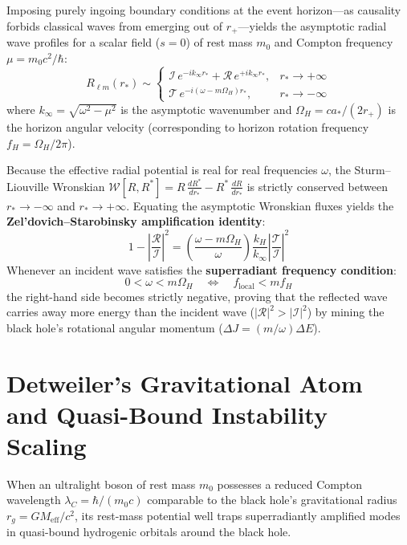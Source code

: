 \documentclass[11pt,a4paper]{article}
\begin{document}
Imposing purely ingoing boundary conditions at the event horizon---as causality forbids classical waves from emerging out of $r_+$---yields the asymptotic radial wave profiles for a scalar field ($s = 0$) of rest mass $m_0$ and Compton frequency $\mu = m_0 c^2 / \hbar$:
\begin{equation}
R_{\ell m}(r_*) \sim \begin{cases} \mathcal{I}\,e^{-i k_\infty r_*} + \mathcal{R}\,e^{+i k_\infty r_*}, & r_* \to +\infty \\ \mathcal{T}\,e^{-i (\omega - m\Omega_H) r_*}, & r_* \to -\infty \end{cases}
\end{equation}
where $k_\infty = \sqrt{\omega^2 - \mu^2}$ is the asymptotic wavenumber and $\Omega_H = c a_* / (2 r_+)$ is the horizon angular velocity (corresponding to horizon rotation frequency $f_H = \Omega_H / 2\pi$).

Because the effective radial potential is real for real frequencies $\omega$, the Sturm--Liouville Wronskian $\mathcal{W}[R, R^*] = R\,\frac{dR^*}{dr_*} - R^*\,\frac{dR}{dr_*}$ is strictly conserved between $r_* \to -\infty$ and $r_* \to +\infty$. Equating the asymptotic Wronskian fluxes yields the \textbf{Zel'dovich--Starobinsky amplification identity}:
\begin{equation}
1 - \left|\frac{\mathcal{R}}{\mathcal{I}}\right|^2 = \left(\frac{\omega - m\Omega_H}{\omega}\right)\frac{k_H}{k_\infty}\left|\frac{\mathcal{T}}{\mathcal{I}}\right|^2
\end{equation}
Whenever an incident wave satisfies the \textbf{superradiant frequency condition}:
\begin{equation}
0 < \omega < m\Omega_H \quad \Longleftrightarrow \quad f_{\text{local}} < m f_H
\end{equation}
the right-hand side becomes strictly negative, proving that the reflected wave carries away more energy than the incident wave ($|\mathcal{R}|^2 > |\mathcal{I}|^2$) by mining the black hole's rotational angular momentum ($\Delta J = (m/\omega)\Delta E$).

\section{Detweiler's Gravitational Atom and Quasi-Bound Instability Scaling}
When an ultralight boson of rest mass $m_0$ possesses a reduced Compton wavelength $\lambda_C = \hbar / (m_0 c)$ comparable to the black hole's gravitational radius $r_g = GM_{\text{eff}} / c^2$, its rest-mass potential well traps superradiantly amplified modes in quasi-bound hydrogenic orbitals around the black hole.
\end{document}
